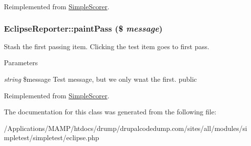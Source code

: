 Reimplemented from \hyperlink{class_simple_scorer_a1467957d4a23761b8d23d5d0c88b9a89}{SimpleScorer}.\hypertarget{class_eclipse_reporter_a845512e7138f1f8f1fc4a710d0e4960f}{
\subsubsection[{paintPass}]{\setlength{\rightskip}{0pt plus 5cm}EclipseReporter::paintPass (\$ {\em message})}}
\label{class_eclipse_reporter_a845512e7138f1f8f1fc4a710d0e4960f}
Stash the first passing item. Clicking the test item goes to first pass. 
\begin{DoxyParams}{Parameters}
\item[{\em string}]\$message Test message, but we only wnat the first.  public \end{DoxyParams}


Reimplemented from \hyperlink{class_simple_scorer_a02d68e8d94800e50603413d1913c25d0}{SimpleScorer}.

The documentation for this class was generated from the following file:\begin{DoxyCompactItemize}
\item 
/Applications/MAMP/htdocs/drump/drupalcodedump.com/sites/all/modules/simpletest/simpletest/eclipse.php\end{DoxyCompactItemize}
